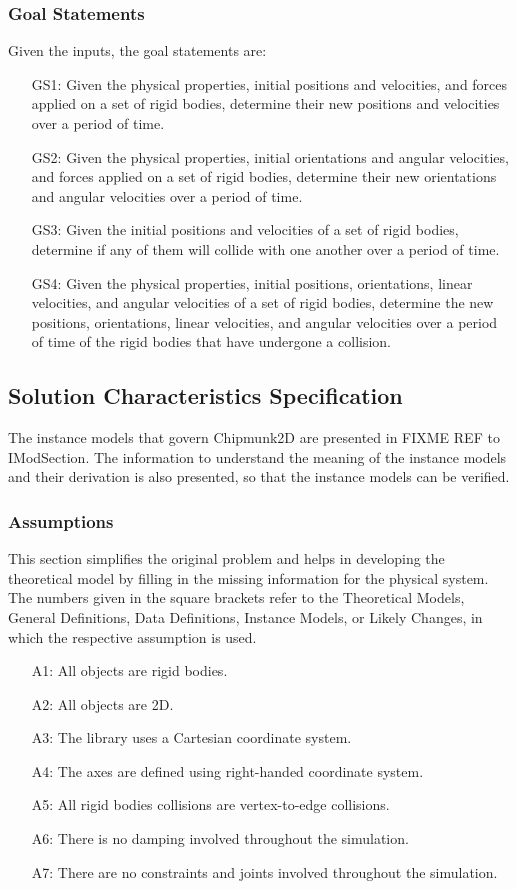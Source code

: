 \documentclass[12pt]{article}
\begin{document}
\subsubsection{Goal Statements}
\label{Sec:GoalStmt}
Given the inputs, the goal statements are:
\begin{itemize}
\item[GS1:]Given the physical properties, initial positions and velocities, and forces applied on a set of rigid bodies, determine their new positions and velocities over a period of time.
\item[GS2:]Given the physical properties, initial orientations and angular velocities, and forces applied on a set of rigid bodies, determine their new orientations and angular velocities over a period of time.
\item[GS3:]Given the initial positions and velocities of a set of rigid bodies, determine if any of them will collide with one another over a period of time.
\item[GS4:]Given the physical properties, initial positions, orientations, linear velocities, and angular velocities of a set of rigid bodies, determine the new positions, orientations, linear velocities, and angular velocities over a period of time of the rigid bodies that have undergone a collision.
\end{itemize}
\subsection{Solution Characteristics Specification}
\label{Sec:SolCharSpec}
The instance models that govern Chipmunk2D are presented in FIXME REF to IModSection. The information to understand the meaning of the instance models and their derivation is also presented, so that the instance models can be verified.
\subsubsection{Assumptions}
\label{Sec:Assumps}
This section simplifies the original problem and helps in developing the theoretical model by filling in the missing information for the physical system. The numbers given in the square brackets refer to the Theoretical Models, General Definitions, Data Definitions, Instance Models, or Likely Changes, in which the respective assumption is used.
\begin{itemize}
\item[A1:]All objects are rigid bodies.
\item[A2:]All objects are 2D.
\item[A3:]The library uses a Cartesian coordinate system.
\item[A4:]The axes are defined using right-handed coordinate system.
\item[A5:]All rigid bodies collisions are vertex-to-edge collisions.
\item[A6:]There is no damping involved throughout the simulation.
\item[A7:]There are no constraints and joints involved throughout the simulation.
\end{itemize}
\end{document}

